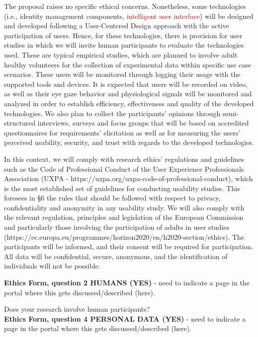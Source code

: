 \documentclass[a4paper,11pt]{article}
\begin{document}
The proposal raises no specific ethical concerns. Nonetheless, some technologies (i.e., identity management components, \textcolor{red}{intelligent user interface}) will be designed and developed following a User-Centered Design approach with the active participation of users. Hence, for these technologies, there is provision for user studies in which we will invite human participants to evaluate the technologies used. These are typical empirical studies, which are planned to involve adult healthy volunteers for the collection of experimental data within specific use case scenarios. These users will be monitored through logging their usage with the supported tools and devices. It is expected that users will be recorded on video, as well as their eye gaze behavior and physiological signals will be monitored and analyzed in order to establish efficiency, effectiveness and quality of the developed technologies. We also plan to collect the participants' opinions through semi-structured interviews, surveys and focus groups that will be based on accredited questionnaires for requirements' elicitation as well as for measuring the users’ perceived usability, security, and trust with regards to the developed technologies.

In this context, we will comply with research ethics' regulations and guidelines such as the Code of Professional Conduct of the User Experience Professionals Association (UXPA - https://uxpa.org/uxpa-code-of-professional-conduct), which is the most established set of guidelines for conducting usability studies. This foresees in §6 the rules that should be followed with respect to privacy, confidentiality and anonymity in any usability study. We will also comply with the relevant regulation, principles and legislation of the European Commission and particularly those involving the participation of adults in user studies (https://ec.europa.eu/programmes/horizon2020/en/h2020-section/ethics). The participants will be informed, and their consent will be required for participation. All data will be confidential, secure, anonymous, and the identification of individuals will not be possible.

\textbf{Ethics Form, question 2 HUMANS (YES)} - need to indicate a page in the portal where this gets discussed/described (here).

Does your research involve human participants?\\

\textbf{Ethics Form, question 4 PERSONAL DATA (YES)} - need to indicate a page in the portal where this gets discussed/described (here).\\
\end{document}
